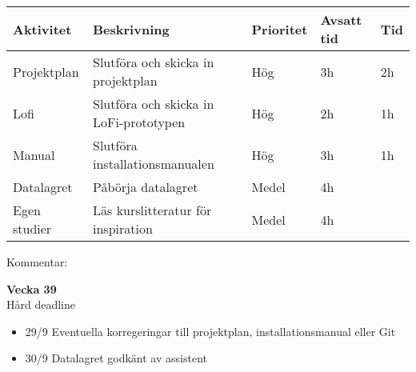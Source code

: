 \documentclass{mall}
\begin{document}
\begin{table}[h]
\begin{tabularx}{\textwidth}{|l|X|l|l|l|}
 \hline
Aktivitet    & Beskrivning                                                                                              & Prioritet  & Avsatt tid & Tid \\ \hline
Projektplan  & Slutföra och skicka in projektplan                                                                       & Hög   & 3h         & 2h    \\ \hline
Lofi         & Slutföra och skicka in LoFi-prototypen                                                                   & Hög   & 2h         & 1h     \\ \hline
Manual       & Slutföra installationsmanualen & Hög   & 3h         & 1h   \\ \hline
Datalagret   & Påbörja datalagret                                                                                       & Medel & 4h         &     \\ \hline
Egen studier & Läs kurslitteratur för inspiration                                                                       & Medel
& 4h         & \\  \hline
\end{tabularx}
\end{table}

Kommentar:

\pagebreak

\hphantom{$\bullet$} \textbf{Vecka 39}\\

Hård deadline

\begin{itemize}
\color{red}
    \item 29/9 Eventuella korregeringar till projektplan, installationsmanual eller Git

    \item 30/9 Datalagret godkänt av assistent
\end{itemize}
\end{document}

